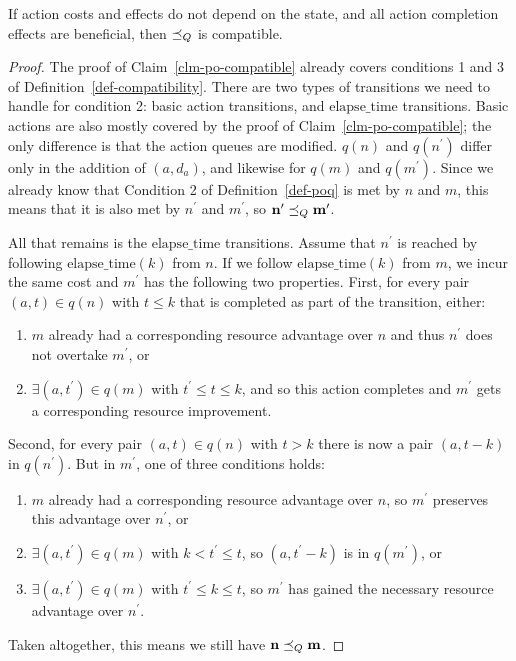 \documentclass[letterpaper]{article}
\theoremstyle{plain} \newtheorem{theorem}{Theorem} \newtheorem{proposition}{Proposition} \newtheorem{lemma}{Lemma}
\theoremstyle{definition} \newtheorem{definition}{Definition} \newtheorem{conjecture}{Conjecture} \newtheorem*{example}{Example}
\theoremstyle{remark} \newtheorem*{remark}{Remark} \newtheorem*{note}{Note} \newtheorem{case}{Case}
\begin{document}
\begin{claim}{}{\label{clm-poq-compatible}}
	If action costs and effects do not depend on the state, and all action completion effects are beneficial, then $\preceq_Q$ is compatible.
\end{claim}
\begin{proof}

	The proof of Claim~\ref{clm-po-compatible} already covers conditions 1 and 3 of
Definition~\ref{def-compatibility}. There are two types of transitions we need to handle
for condition 2: basic action transitions, and $\mathrm{elapse\_time}$ transitions. Basic
actions are also mostly covered by the proof of Claim~\ref{clm-po-compatible}; the only
difference is that the action queues are modified. $q(n)$ and
$q(n^\prime)$ differ only in the addition of $(a, d_a)$, and likewise for $q(m)$ and $q(m^\prime)$. Since we
already know that Condition 2 of Definition~\ref{def-poq} is met by $n$ and $m$, this
means that it is also met by $n^\prime$ and $m^\prime$, so $\textbf{n}^\prime \preceq_Q \textbf{m}^\prime$.

	All that remains is the $\mathrm{elapse\_time}$ transitions. Assume that $n^\prime$ is
reached by following $\mathrm{elapse\_time}(k)$ from $n$. If we follow $\mathrm{elapse\_time}(k)$ from $m$, we incur the same cost and $m^\prime$ has the following two properties. First, for every pair $(a, t) \in q(n)$ with $t \le k$ that is completed as part of the transition, either:
\begin{enumerate}
	\item $m$ already had a corresponding resource advantage over $n$ and thus $n^\prime$ does not overtake $m^\prime$, or
	\item $\exists (a, t^\prime) \in q(m)$ with $t^\prime \le t \le k$, and so this action completes and $m^\prime$ gets a corresponding resource improvement.
\end{enumerate}
Second, for every pair $(a, t) \in q(n)$ with $t > k$ there is now a pair $(a, t-k)$ in $q(n^\prime)$. But in $m^\prime$, one of three conditions holds:
\begin{enumerate}
	\item $m$ already had a corresponding resource advantage over $n$, so $m^\prime$ preserves this advantage over $n^\prime$, or
	\item $\exists (a, t^\prime) \in q(m)$ with $k < t^\prime \le t$, so $(a, t^\prime-k)$ is in $q(m^\prime)$, or
	\item $\exists (a, t^\prime) \in q(m)$ with $t^\prime \le k \le t$, so $m^\prime$ has gained the necessary resource advantage over $n^\prime$.
\end{enumerate}
Taken altogether, this means we still have $\textbf{n} \preceq_Q \textbf{m}$.

\end{proof}
\end{document}
